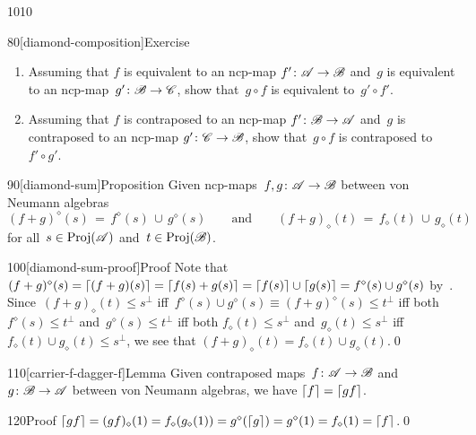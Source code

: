 \begin{parsec}{1010}
\begin{point}{80}[diamond-composition]{Exercise}
\begin{enumerate}
\item
Assuming that $f$ is equivalent 
to an ncp-map $f'\colon \mathscr{A}\to\mathscr{B}$
and~$g$ is equivalent to
an ncp-map~$g'\colon \mathscr{B}\to\mathscr{C}$,
show that~$g\circ f$ is equivalent to~$g'\circ f'$.
\item
Assuming that $f$ is contraposed to
an ncp-map $f'\colon \mathscr{B}\to\mathscr{A}$
and~$g$ is contraposed to
an ncp-map $g'\colon \mathscr{C}\to\mathscr{B}$,
show that~$g\circ f$ is contraposed to~$f'\circ g'$.
\end{enumerate}
\spacingfix
\end{point}%
\begin{point}{90}[diamond-sum]{Proposition}%
Given ncp-maps~$f,g\colon \mathscr{A}\to\mathscr{B}$
between von Neumann algebras
\begin{equation*}
(f+g)^\diamond(s) \,=\, f^\diamond(s)\, \cup\, g^\diamond(s)
\qquad
\text{and}
\qquad (f+g)_\diamond(t)\, =\, f_\diamond(t) \,\cup\, g_\diamond(t)
\end{equation*}
for all~$s\in \operatorname{Proj}(\mathscr{A})$ and~$t\in \operatorname{Proj}(\mathscr{B})$.
\begin{point}{100}[diamond-sum-proof]{Proof}%
Note that $(f+g)^\diamond(s)
=  \left\lceil(f+g)(s)\right\rceil
= \left\lceil f(s)+g(s)\right\rceil
= \left\lceil f(s)\right\rceil\cup \left\lceil g(s)\right\rceil
= f^\diamond(s) \cup g^\diamond(s)$
by~.
Since~$(f+g)_\diamond(t)\leq s^\perp$
iff~$f^\diamond(s)\cup g^\diamond(s)\equiv (f+g)^\diamond(s)\leq t^\perp$
iff both $f^\diamond(s)\leq t^\perp$ and~$g^\diamond(s)\leq t^\perp$
iff both $f_\diamond(t)\leq s^\perp$ and~$g_\diamond(t)\leq s^\perp$
iff~$f_\diamond(t)\cup g_\diamond(t)\leq s^\perp$,
we see that $(f+g)_\diamond(t)=f_\diamond(t)\cup g_\diamond(t)$.\qed
\end{point}
\end{point}
\begin{point}{110}[carrier-f-dagger-f]{Lemma}%
Given contraposed
maps~$f\colon \mathscr{A}\to\mathscr{B}$
and~$g\colon \mathscr{B}\to\mathscr{A}$ between von Neumann algebras,
we have $\left\lceil f\right\rceil=\left\lceil gf\right\rceil$.
\begin{point}{120}{Proof}%
$\left\lceil gf\right\rceil=(gf)_\diamond(1)
= f_\diamond(g_\diamond(1))
= g^\diamond(\left\lceil g\right\rceil)
= g^\diamond(1)=f_\diamond(1)=\left\lceil f\right\rceil$.\qed
\end{point}
\end{point}
\end{parsec}
